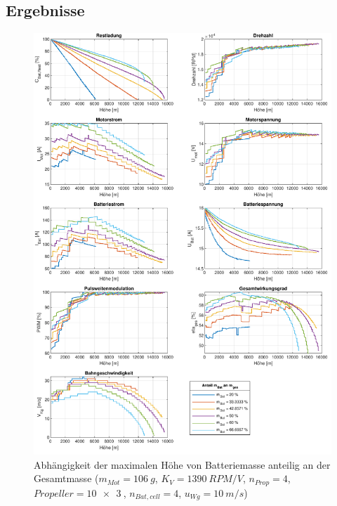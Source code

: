 \subsection{Ergebnisse}
\label{subsec:ergebnis_massenverteilung}
\newpage
\begin{figure}[H]
\centering
	\includegraphics[scale=0.70]{Diagramme/Batteriemasse.pdf}
	\caption{Abhängigkeit der maximalen Höhe von Batteriemasse anteilig an der Gesamtmasse (\ensuremath{m_{Mot}=\SI{106}{g}}, \ensuremath{K_V=\SI{1390}{RPM/V}}, \ensuremath{n_{Prop}=4}, \ensuremath{Propeller=\SI{10x3}{}}, \ensuremath{n_{Bat,cell}=4}, \ensuremath{u_{Wg}=\SI{10}{m/s}})}
	\label{abb:batteriemasse}
\end{figure}

